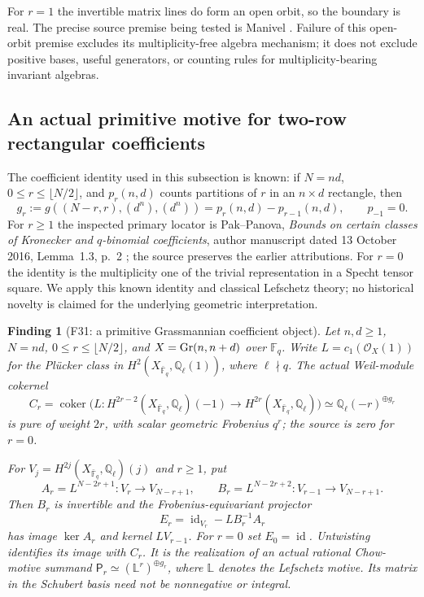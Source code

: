 \documentclass[11pt,a4paper]{article}
\newcommand{\Q}{\mathbb Q}\newcommand{\Z}{\mathbb Z}\newcommand{\C}{\mathbb C}\newcommand{\N}{\mathbb N}\newcommand{\F}{\mathbb F}
\newcommand{\id}{\operatorname{id}}\newcommand{\et}{\mathrm{\acute et}}\newcommand{\boxt}{\boxtimes}
\renewcommand{\S}{\ensuremath{\mathsection}}
\newcommand{\fid}[1]{\textsf{#1}}\newcommand{\gate}[1]{\textsf{#1}}
\theoremstyle{named}\newtheorem{finding}{Finding}[section]
\theoremstyle{definition}\newtheorem{definition}[finding]{Definition}
\theoremstyle{remark}\newtheorem{remark}[finding]{Remark}
\begin{document}
For $r=1$ the invertible matrix lines do form an open orbit, so the
boundary is real. The precise source premise being tested is Manivel
\cite[Lemma~1 and Corollary~1, \S3, p.~3]{Manivel}. Failure
of this open-orbit premise excludes its multiplicity-free algebra
mechanism; it does not exclude positive bases, useful generators,
or counting rules for multiplicity-bearing invariant algebras.

\subsection{An actual primitive motive for two-row rectangular coefficients}
The coefficient identity used in this subsection is known:
if $N=nd$, $0\le r\le\lfloor N/2\rfloor$, and $p_r(n,d)$ counts
partitions of $r$ in an $n\times d$ rectangle, then
\begin{equation}\label{eq:rectprimitiveknown}
 g_r:=g((N-r,r),(d^n),(d^n))=p_r(n,d)-p_{r-1}(n,d),
 \qquad p_{-1}=0.
\end{equation}
For $r\ge1$ the inspected primary locator is Pak--Panova,
\emph{Bounds on certain classes of Kronecker and $q$-binomial
coefficients}, author manuscript dated 13 October 2016,
Lemma~1.3, p.~2 \cite{PPBounds}; the source preserves the earlier
attributions. For $r=0$ the identity is the multiplicity one of the
trivial representation in a Specht tensor square. We apply this
known identity and classical Lefschetz theory; no historical
novelty is claimed for the underlying geometric interpretation.

\begin{finding}[\fid{F31}: a primitive Grassmannian coefficient object]\label{f:grassprimitive}
Let $n,d\ge1$, $N=nd$, $0\le r\le\lfloor N/2\rfloor$, and
$X=\operatorname{Gr}(n,n+d)$ over $\F_q$. Write $L=c_1(\mathcal O_X(1))$
for the Pl\"ucker class in $H^2(X_{\bar{\F}_q},\Q_\ell(1))$,
where $\ell\nmid q$. The actual Weil-module cokernel
\begin{equation}\label{eq:rectprimitivecoker}
 C_r=\operatorname{coker}\bigl(
 L:H^{2r-2}(X_{\bar{\F}_q},\Q_\ell)(-1)
       \longrightarrow H^{2r}(X_{\bar{\F}_q},\Q_\ell)\bigr)
 \simeq\Q_\ell(-r)^{\oplus g_r}
\end{equation}
is pure of weight $2r$, with scalar geometric Frobenius $q^r$;
the source is zero for $r=0$.

For $V_j=H^{2j}(X_{\bar{\F}_q},\Q_\ell)(j)$ and $r\ge1$, put
\[
 A_r=L^{N-2r+1}:V_r\longrightarrow V_{N-r+1},\qquad
 B_r=L^{N-2r+2}:V_{r-1}\longrightarrow V_{N-r+1}.
\]
Then $B_r$ is invertible and the Frobenius-equivariant projector
\begin{equation}\label{eq:rectprimitiveprojector}
 E_r=\id_{V_r}-L B_r^{-1}A_r
\end{equation}
has image $\ker A_r$ and kernel $L V_{r-1}$. For $r=0$ set
$E_0=\id$. Untwisting identifies its image with $C_r$.
It is the realization of an actual rational Chow-motive summand
$\mathsf P_r\simeq(\mathbb L^r)^{\oplus g_r}$, where
$\mathbb L$ denotes the Lefschetz motive. Its matrix in the
Schubert basis need not be nonnegative or integral.
\end{finding}
\end{document}
